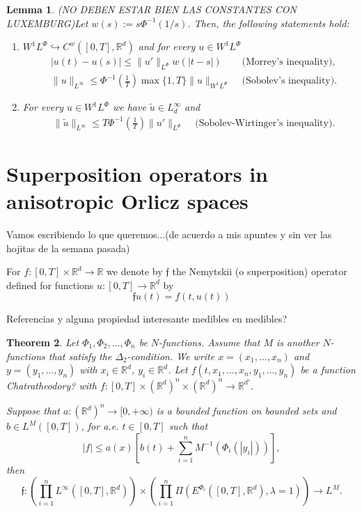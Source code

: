 \documentclass[twoside]{article}
\newtheorem{thm}{Theorem}[section]
\newtheorem{lem}[thm]{Lemma}
\theoremstyle{remark}
\newcommand{\orlnor}{\|_{L^{\Phi}}}
\newcommand{\lphi}{L^{\Phi}}
\newcommand{\lmj}{L^{M}}
\newcommand{\wphi}{W^{1}\lphi}
\newcommand{\sobnor}{\|_{W^{1}\lphi}}
\newcommand{\rr}{\mathbb{R}}
\renewcommand{\leq}{\leqslant}
\begin{document}
\begin{lem}(NO DEBEN ESTAR BIEN LAS CONSTANTES CON LUXEMBURG)\label{inclusion orlicz} Let  $w(s):= s\Phi^{-1}(1/s)$. Then, the following statements hold:
\begin{enumerate}
\item\label{inclusion orlicz_item1} $\wphi\hookrightarrow C^w([0,T],\rr^d) $ and for every $u\in\wphi$
\begin{align}
 &\left|u(t)-u(s) \right| \leq  \|u'\orlnor w(| t-s|)&\text{  (Morrey's inequality),}\label{in-sob-cont}
\\
& \|u\|_{L^{\infty}} \leq\Phi^{-1}\left(\frac{1}{T}\right)\max\{1,T\}\|u\sobnor&\text{  (Sobolev's inequality).}\label{sobolev}
\end{align}
\item For every $u\in\wphi$ we have $\widetilde{u}\in L^{\infty}_d$ and
\begin{align}
& \|\widetilde{u}\|_{L^{\infty}} \leq T\Phi^{-1}\left(\frac{1}{T}\right)\|u'\orlnor&
\text{  (Sobolev-Wirtinger's inequality).}\label{wirtinger}
\end{align}




\end{enumerate}
\end{lem}


\section{Superposition operators in anisotropic Orlicz spaces}

Vamos escribiendo lo que queremos...(de acuerdo a mis apuntes y sin ver las hojitas de la semana pasada)

For $f:[0,T]\times \rr^d\to\rr$  we denote by $\mathfrak{f}$ the Nemytskii (o superposition) operator defined for functions $u:[0,T]\to\rr^d$ by 
\[\mathfrak{f}u(t)=f(t,u(t))\]

Referencias y alguna propiedad interesante medibles en medibles? \cite{krasnosel2011integral,KR}


\begin{thm}
Let $\Phi_1,\Phi_2,\dots,\Phi_n$ be $N$-functions. 
Assume that $M$ is another $N$-functions that satisfy the $\Delta_2$-condition. 
We write $x=(x_1,\dots,x_n)$  and $y=(y_1,\dots,y_n)$ with $x_i\in \rr^d$, $y_i\in \rr^d$.
Let $f(t,x_1,\ldots,x_n,y_1,\ldots,y_n)$ be a function Chatratheodory? with $f:[0,T]\times {(\rr^d)}^n\times {(\rr^d)}^n \to \rr^{d'}$.

Suppose that $a:(\rr^d)^n\to [0,+\infty)$ is a bounded function on bounded sets and 
$b \in L^{M}([0,T])$, for a.e. $t \in [0, T]$ such that 
\begin{equation}\label{eq:condicion estru gral}
|f|\leq a(x)[ b(t)+\sum_{i=1}^{n} M^{-1}(\Phi_i(|y_i|))],
\end{equation}
then 
\[
\mathfrak{f}:\left(\prod\limits_{i=1}^n L^{\infty}([0,T],\rr^d)\right) \times \left(\prod\limits_{i=1}^n \Pi(E^{\Phi_i}([0,T],\rr^d),\lambda=1)\right)
\to \lmj.\]
\end{thm}
\end{document}
